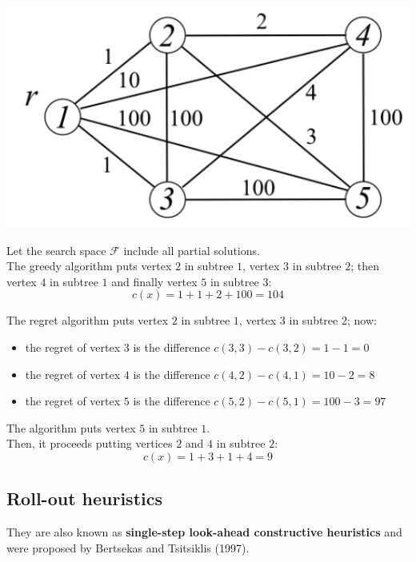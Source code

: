 \begin{center}
	\includegraphics[width=0.5\columnwidth]{img/RBCSMTP}
\end{center}

Let the search space $\mathcal{F}$ include all partial solutions.\\

The greedy algorithm puts vertex $2$ in subtree $1$, vertex $3$ in subtree $2$; then vertex $4$ in subtree $1$ and finally vertex $5$ in subtree $3$:
$$ c(x) = 1 + 1 + 2 + 100 = 104$$ 

The regret algorithm puts vertex $2$ in subtree $1$, vertex $3$ in subtree $2$; now:
\begin{itemize}
	\item the regret of vertex $3$ is the difference $c(3, 3) − c(3, 2) = 1 − 1 = 0$
	\item the regret of vertex $4$ is the difference $c(4, 2) − c(4, 1) = 10 − 2 = 8$
	\item the regret of vertex $5$ is the difference $c(5, 2) − c(5, 1) = 100 − 3 = 97$
\end{itemize}
The algorithm puts vertex $5$ in subtree $1$.\\
Then, it proceeds putting vertices $2$ and $4$ in subtree $2$:
$$ c(x) = 1 + 3 + 1 + 4 = 9 $$

\newpage

\subsection{Roll-out heuristics}
They are also known as \textbf{single-step look-ahead constructive heuristics} and were proposed by Bertsekas and Tsitsiklis (1997).\\

